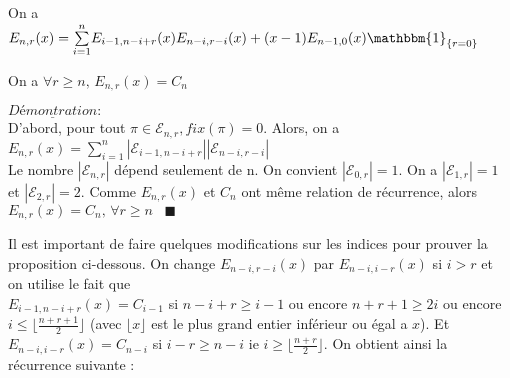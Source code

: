 \begin{corollaire}\label{c5}
	On a $E_{n, r}(x) = \underset{i=1}{\overset{n}{\sum}}E_{i-1, n-i+r}(x)E_{n-i, r-i}(x) + (x-1)E_{n-1,0}(x)\mathbbm{1}_{\{r=0\}}$
\end{corollaire}

\begin{proposition}
	On a $\forall r\geq n\text{, }E_{n,r}(x) = C_{n}$
\end{proposition}
$\underline{\textit{Démontration}}:$\\
D'abord, pour tout $ \pi \in \mathcal{E}_{n, r}, fix(\pi)=0$. Alors, on a
$E_{n,r}(x)= \sum_{i=1}^{n}| \mathcal{E}_{i-1, n-i+r}||\mathcal{E}_{n-i, r-i}|$\\
Le nombre $|\mathcal{E}_{n, r}|$ dépend seulement de n. On convient $|\mathcal{E}_{0, r}|=1$. On a  $|\mathcal{E}_{1, r}|=1$ et  $|\mathcal{E}_{2, r}|=2$. Comme $E_{n,r}(x)$ et $C_{n}$ ont même relation de récurrence, alors $E_{n,r}(x) = C_{n}\text{, }\forall r\geq n \hspace{10pt}\blacksquare$ \vspace{15pt}

Il est important de faire quelques modifications sur les indices pour prouver la proposition ci-dessous.
On change $E_{n-i,r-i}(x)$ par $E_{n-i,i-r}(x)$ si $i>r$ et on utilise le fait que\\ $E_{i-1,n-i+r}(x)=C_{i-1}$ si $n-i+r\geq i-1$ ou encore $n+r+1\geq 2i$
ou encore $i\leq \lfloor \frac{n+r+1}{2}\rfloor$ (avec $\lfloor x \rfloor$ est le plus grand entier inférieur ou égal a $x$). Et $E_{n-i,i-r}(x)=C_{n-i}$ si $i-r\geq n-i$ ie $i\geq \lfloor \frac{n+r}{2}\rfloor$. On obtient ainsi la récurrence suivante :


